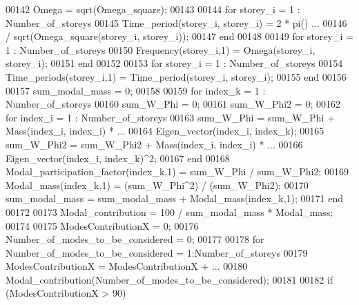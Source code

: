 \begin{DoxyCode}
{{{{{{{{{{{{{{{{{{{{{00142 \textcolor{stringliteral}{Omega = sqrt(Omega\_square);}
00143 \textcolor{stringliteral}{}
00144 \textcolor{stringliteral}{for storey\_i = 1 : Number\_of\_storeys}
00145 \textcolor{stringliteral}{  Time\_period(storey\_i, storey\_i) = 2 * pi() ...}
00146 \textcolor{stringliteral}{    / sqrt(Omega\_square(storey\_i, storey\_i)); }
00147 \textcolor{stringliteral}{end}
00148 \textcolor{stringliteral}{}
00149 \textcolor{stringliteral}{for storey\_i = 1 : Number\_of\_storeys}
00150 \textcolor{stringliteral}{  Frequency(storey\_i,1) = Omega(storey\_i, storey\_i);}
00151 \textcolor{stringliteral}{end}
00152 \textcolor{stringliteral}{}
00153 \textcolor{stringliteral}{for storey\_i = 1 : Number\_of\_storeys}
00154 \textcolor{stringliteral}{  Time\_periods(storey\_i,1) = Time\_period(storey\_i, storey\_i);}
00155 \textcolor{stringliteral}{end}
00156 \textcolor{stringliteral}{}
00157 \textcolor{stringliteral}{sum\_modal\_mass = 0;}
00158 \textcolor{stringliteral}{}
00159 \textcolor{stringliteral}{for index\_k = 1 : Number\_of\_storeys}
00160 \textcolor{stringliteral}{  sum\_W\_Phi = 0;}
00161 \textcolor{stringliteral}{  sum\_W\_Phi2 = 0;}
00162 \textcolor{stringliteral}{  for index\_i = 1 : Number\_of\_storeys}
00163 \textcolor{stringliteral}{    sum\_W\_Phi = sum\_W\_Phi + Mass(index\_i, index\_i) * ...}
00164 \textcolor{stringliteral}{      Eigen\_vector(index\_i, index\_k);}
00165 \textcolor{stringliteral}{    sum\_W\_Phi2 = sum\_W\_Phi2 + Mass(index\_i, index\_i) * ...}
00166 \textcolor{stringliteral}{      Eigen\_vector(index\_i, index\_k)^2;}
00167 \textcolor{stringliteral}{  end}
00168 \textcolor{stringliteral}{  Modal\_participation\_factor(index\_k,1) = sum\_W\_Phi / sum\_W\_Phi2;}
00169 \textcolor{stringliteral}{  Modal\_mass(index\_k,1) = (sum\_W\_Phi^2) / (sum\_W\_Phi2);}
00170 \textcolor{stringliteral}{  sum\_modal\_mass = sum\_modal\_mass + Modal\_mass(index\_k,1);  }
00171 \textcolor{stringliteral}{end}
00172 \textcolor{stringliteral}{}
00173 \textcolor{stringliteral}{Modal\_contribution = 100 / sum\_modal\_mass * Modal\_mass;}
00174 \textcolor{stringliteral}{}
00175 \textcolor{stringliteral}{ModesContributionX = 0;}
00176 \textcolor{stringliteral}{Number\_of\_modes\_to\_be\_considered = 0;}
00177 \textcolor{stringliteral}{}
00178 \textcolor{stringliteral}{for Number\_of\_modes\_to\_be\_considered = 1:Number\_of\_storeys}
00179 \textcolor{stringliteral}{  ModesContributionX = ModesContributionX + ...}
00180 \textcolor{stringliteral}{    Modal\_contribution(Number\_of\_modes\_to\_be\_considered); }
00181 \textcolor{stringliteral}{ }
00182 \textcolor{stringliteral}{  if (ModesContributionX > 90)}
}}}}}}}}}}}}}}}}}}}}}
\end{DoxyCode}

